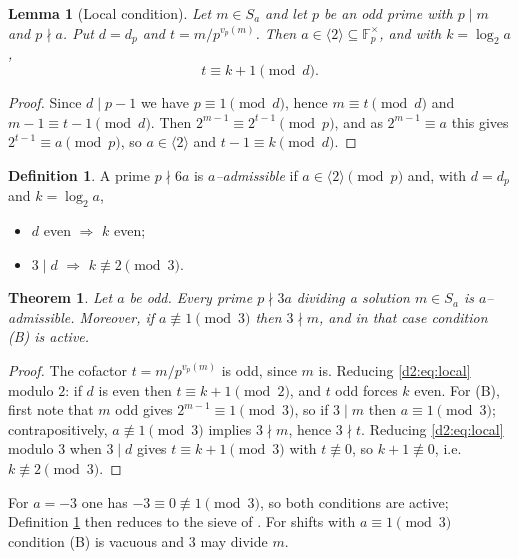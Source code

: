 \documentclass[a4paper]{article}
\theoremstyle{plain}
\newtheorem{theorem}{Theorem}[subsection]
\newtheorem{lemma}{Lemma}[subsection]
\theoremstyle{definition}
\newtheorem{definition}{Definition}[subsection]
\theoremstyle{remark}
\newcommand{\F}{\mathbb{F}}
\newcommand{\dvd}{\mid}
\newcommand{\Sa}{S_a}
\begin{document}
\begin{lemma}[Local condition]\label{d2:lem:local}
Let $m\in\Sa$ and let $p$ be an odd prime with $p\dvd m$ and $p\nmid a$. Put $d=d_p$ and $t=m/p^{v_p(m)}$. Then $a\in\langle2\rangle\subseteq\F_p^{\times}$, and with $k=\log_2a$,
\begin{equation}\label{d2:eq:local}
t\equiv k+1\pmod d.
\end{equation}
\end{lemma}

\begin{proof}
Since $d\dvd p-1$ we have $p\equiv1\pmod d$, hence $m\equiv t\pmod d$ and $m-1\equiv t-1\pmod d$. Then $2^{m-1}\equiv2^{t-1}\pmod p$, and as $2^{m-1}\equiv a$ this gives $2^{t-1}\equiv a\pmod p$, so $a\in\langle2\rangle$ and $t-1\equiv k\pmod d$.
\end{proof}

\begin{definition}\label{d2:def:admissible}
A prime $p\nmid 6a$ is \emph{$a$--admissible} if $a\in\langle2\rangle\pmod p$ and, with $d=d_p$ and $k=\log_2a$,
\begin{itemize}
\item[(A)] $d$ even $\Rightarrow$ $k$ even;
\item[(B)] $3\dvd d$ $\Rightarrow$ $k\not\equiv2\pmod3$.
\end{itemize}
\end{definition}

\begin{theorem}\label{d2:thm:admissible}
Let $a$ be odd. Every prime $p\nmid3a$ dividing a solution $m\in\Sa$ is $a$--admissible. Moreover, if $a\not\equiv1\pmod3$ then $3\nmid m$, and in that case condition \textnormal{(B)} is active.
\end{theorem}

\begin{proof}
The cofactor $t=m/p^{v_p(m)}$ is odd, since $m$ is. Reducing \eqref{d2:eq:local} modulo $2$: if $d$ is even then $t\equiv k+1\pmod2$, and $t$ odd forces $k$ even. For (B), first note that $m$ odd gives $2^{m-1}\equiv1\pmod3$, so if $3\dvd m$ then $a\equiv1\pmod3$; contrapositively, $a\not\equiv1\pmod3$ implies $3\nmid m$, hence $3\nmid t$. Reducing \eqref{d2:eq:local} modulo $3$ when $3\dvd d$ gives $t\equiv k+1\pmod3$ with $t\not\equiv0$, so $k+1\not\equiv0$, i.e.\ $k\not\equiv2\pmod3$.
\end{proof}

For $a=-3$ one has $-3\equiv0\not\equiv1\pmod3$, so both conditions are active; Definition \ref{d2:def:admissible} then reduces to the sieve of \cite{d2:prior}. For shifts with $a\equiv1\pmod3$ condition (B) is vacuous and $3$ may divide $m$.
\end{document}
